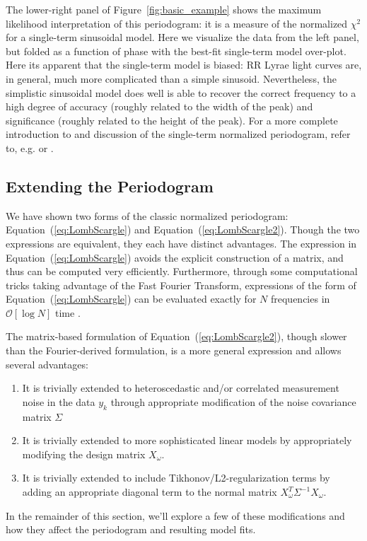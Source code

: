 \documentclass[12pt,preprint]{aastex}
\newcommand{\Fig}[1]{Figure~\ref{fig:#1}}
\newcommand{\fig}[1]{\Fig{#1}}
\newcommand{\Eq}[1]{Equation~(\ref{eq:#1})}
\newcommand{\eq}[1]{\Eq{#1}}
\begin{document}
The lower-right panel of \fig{basic_example} shows the maximum likelihood interpretation of this periodogram: it is a measure of the normalized $\chi^2$ for a single-term sinusoidal model. Here we visualize the data from the left panel, but folded as a function of phase with the best-fit single-term model over-plot. Here its apparent that the single-term model is biased: RR Lyrae light curves are, in general, much more complicated than a simple sinusoid. Nevertheless, the simplistic sinusoidal model does well is able to recover the correct frequency to a high degree of accuracy (roughly related to the width of the peak) and significance (roughly related to the height of the peak). For a more complete introduction to and discussion of the single-term normalized periodogram, refer to, e.g. \citet{Bretthorst88} or \citet{ICVG2014}.

\subsection{Extending the Periodogram}
We have shown two forms of the classic normalized periodogram: \eq{LombScargle} and \eq{LombScargle2}. Though the two expressions are equivalent, they each have distinct advantages. The expression in \eq{LombScargle} avoids the explicit construction of a matrix, and thus can be computed very efficiently. Furthermore, through some computational tricks taking advantage of the Fast Fourier Transform, expressions of the form of \eq{LombScargle} can be evaluated exactly for $N$ frequencies in $\mathcal{O}[\log{N}]$ time \citep{Press89}.

The matrix-based formulation of \eq{LombScargle2}, though slower than the Fourier-derived formulation, is a more general expression and allows several advantages:
\begin{enumerate}
  \item It is trivially extended to heteroscedastic and/or correlated measurement noise in the data $y_k$ through appropriate modification of the noise covariance matrix $\Sigma$
  \item It is trivially extended to more sophisticated linear models by appropriately modifying the design matrix $X_\omega$.
  \item It is trivially extended to include Tikhonov/L2-regularization terms by adding an appropriate diagonal term to the normal matrix $X_\omega^T\Sigma^{-1}X_\omega$.
\end{enumerate}
In the remainder of this section, we'll explore a few of these modifications and how they affect the periodogram and resulting model fits.
\end{document}
